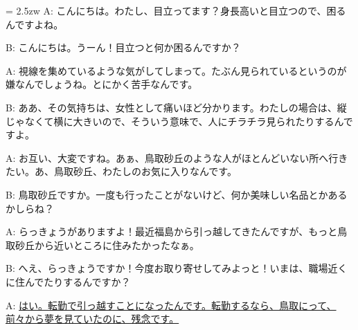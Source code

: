 \documentclass[11pt]{amsart}
\title{}
\author{}
\newenvironment{hangall}[1]{\hangindent = 2.5zw\everypar{\hangindent = 2.5zw}}{}
\begin{document}
\maketitle
\begin{hangall}{}%
A: こんにちは。わたし、目立ってます？身長高いと目立つので、困るんですよね。

B: こんにちは。うーん！目立つと何か困るんですか？

A: 視線を集めているような気がしてしまって。たぶん見られているというのが嫌なんでしょうね。とにかく苦手なんです。

B: ああ、その気持ちは、女性として痛いほど分かります。わたしの場合は、縦じゃなくて横に大きいので、そういう意味で、人にチラチラ見られたりするんですよ。

A: お互い、大変ですね。あぁ、鳥取砂丘のような人がほとんどいない所へ行きたい。あ、鳥取砂丘、わたしのお気に入りなんです。

B: 鳥取砂丘ですか。一度も行ったことがないけど、何か美味しい名品とかあるかしらね？

A: らっきょうがありますよ！最近福島から引っ越してきたんですが、もっと鳥取砂丘から近いところに住みたかったなぁ。

B: へえ、らっきょうですか！今度お取り寄せしてみよっと！いまは、職場近くに住んでたりするんですか？

A: \ul{はい。転勤で引っ越すことになったんです。転勤するなら、鳥取にって、前々から夢を見ていたのに、残念です。}\end{hangall}
\end{document}
